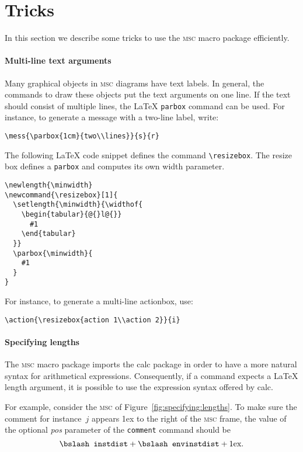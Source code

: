 \documentclass[a4paper]{article}
\newcommand{\cmd}[1]{\texttt{\bslash #1}}
\newcommand{\acro}[1]{{\scshape\lowercase{#1}}}
\newcommand\MSC{\acro{MSC}}
\newcommand{\mscpack}{\MSC{} macro package}
\begin{document}
\section{Tricks}
\label{sec:tricks}

In this section we describe some tricks to use the \mscpack{}
efficiently.

\paragraph{Multi-line text arguments}
Many graphical objects in \MSC{} diagrams have text labels. In general,
the commands to draw these objects put the text arguments on one
line. If the text should consist of multiple lines, the \LaTeX{}
\cmd{parbox} command can be used. For instance, to generate a message
with a two-line label, write:

\begin{verbatim}
\mess{\parbox{1cm}{two\\lines}}{s}{r}
\end{verbatim}

The following \LaTeX{} code snippet defines the command
\verb+\resizebox+. The resize box defines a \cmd{parbox} and computes
its own width parameter.

\begin{verbatim}
\newlength{\minwidth}
\newcommand{\resizebox}[1]{
  \setlength{\minwidth}{\widthof{
    \begin{tabular}{@{}l@{}}
      #1
    \end{tabular}
  }}
  \parbox{\minwidth}{
    #1
  }
}
\end{verbatim}

For instance, to generate a multi-line actionbox, use:

\begin{verbatim}
\action{\resizebox{action 1\\action 2}}{i}
\end{verbatim}

\paragraph{Specifying lengths}
The \mscpack{} imports the \textsf{calc} package in order to have a
more natural syntax for arithmetical expressions.  Consequently, if a
command expects a \LaTeX{} length argument, it is possible to use the
expression syntax offered by \textsf{calc}.

For example, consider the \MSC{} of
Figure~\ref{fig:specifying:lengths}. To make sure the comment for
instance~$j$ appears 1ex to the right of the \MSC{} frame, the value
of the optional \emph{pos} parameter of the \cmd{comment} command
should be
\[ \cmd{instdist} + \cmd{envinstdist} + 1\textrm{ex}. \]
\end{document}
